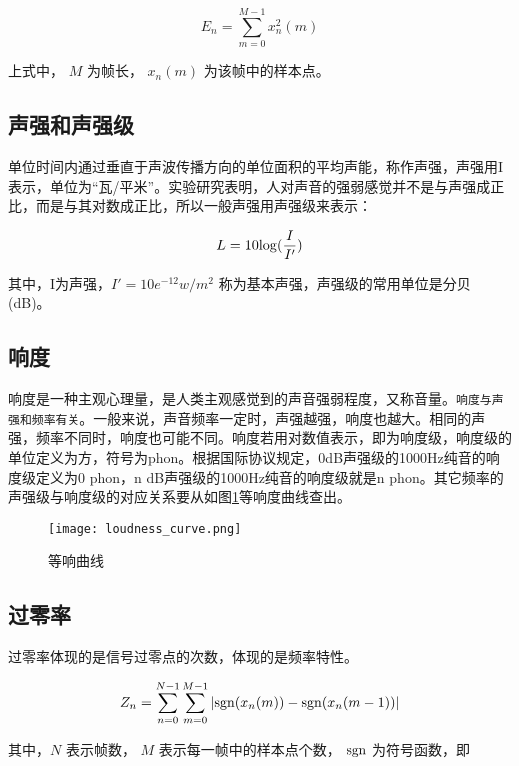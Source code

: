 \documentclass[cn,10pt,math=newtx,citestyle=gb7714-2015,bibstyle=gb7714-2015]{elegantbook}
\begin{document}
\begin{equation}
  E_n=\sum_{m=0}^{M-1}x_n^2(m)
\end{equation}

上式中， $M$ 为帧长， $x_n(m)$ 为该帧中的样本点。

\subsection{声强和声强级}

单位时间内通过垂直于声波传播方向的单位面积的平均声能，称作声强，声强用I表示，单位为“瓦/平米”。实验研究表明，人对声音的强弱感觉并不是与声强成正比，而是与其对数成正比，所以一般声强用声强级来表示：

\begin{equation}
  L=10{\rm log}(\frac{I}{I'})
\end{equation}

其中，I为声强，$I'=10e^{-12}w/m^2$ 称为基本声强，声强级的常用单位是分贝(dB)。

\subsection{响度}

响度是一种主观心理量，是人类主观感觉到的声音强弱程度，又称音量。\lstinline{响度与声强和频率有关}。一般来说，声音频率一定时，声强越强，响度也越大。相同的声强，频率不同时，响度也可能不同。响度若用对数值表示，即为响度级，响度级的单位定义为方，符号为phon。根据国际协议规定，0dB声强级的1000Hz纯音的响度级定义为0 phon，n dB声强级的1000Hz纯音的响度级就是n phon。其它频率的声强级与响度级的对应关系要从如图\ref{fig:loudness_curve}等响度曲线查出。

\begin{figure}[htbp]
  \centering
  \texttt{[image: loudness\_curve.png]}
  \caption{等响曲线 \label{fig:loudness_curve}}
\end{figure}

\subsection{过零率}

过零率体现的是信号过零点的次数，体现的是频率特性。

\begin{equation}
  Z_n=\sum_{n=0}^{N-1}\sum_{m=0}^{M-1}|{\rm sgn}(x_n(m))-{\rm sgn}(x_n(m-1))|
\end{equation}

其中，$N$ 表示帧数， $M$ 表示每一帧中的样本点个数， ${\rm sgn}$ 为符号函数，即
\end{document}
